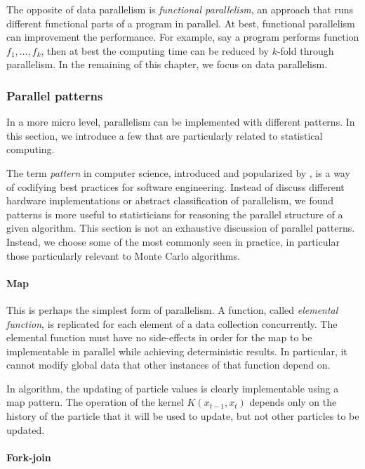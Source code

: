 The opposite of data parallelism is \emph{functional parallelism}, an approach
that runs different functional parts of a program in parallel. At best,
functional parallelism can improvement the performance. For example, say a
program performs function $f_1,\dots,f_k$, then at best the computing time can
be reduced by $k$-fold through parallelism. In the remaining of this chapter,
we focus on data parallelism.

\subsubsection{Parallel patterns}
\label{ssub:Parallel patterns}

In a more micro level, parallelism can be implemented with different patterns.
In this section, we introduce a few that are particularly related to
statistical computing.

The term \emph{pattern} in computer science, introduced and popularized by
\cite{software:GoF}, is a way of codifying best practices for software
engineering. Instead of discuss different hardware implementations or abstract
classification of parallelism, we found patterns is more useful to
statisticians for reasoning the parallel structure of a given algorithm. This
section is not an exhaustive discussion of parallel patterns. Instead, we
choose some of the most commonly seen in practice, in particular those
particularly relevant to Monte Carlo algorithms.

\paragraph{Map}

This is perhaps the simplest form of parallelism. A function, called
\emph{elemental function}, is replicated for each element of a data collection
concurrently. The elemental function must have no side-effects in order for
the map to be implementable in parallel while achieving deterministic results.
In particular, it cannot modify global data that other instances of that
function depend on.

In \smc algorithm, the updating of particle values is clearly implementable
using a map pattern. The operation of the kernel $K(x_{t-1},x_t)$ depends only
on the history of the particle that it will be used to update, but not other
particles to be updated.

\paragraph{Fork-join}


